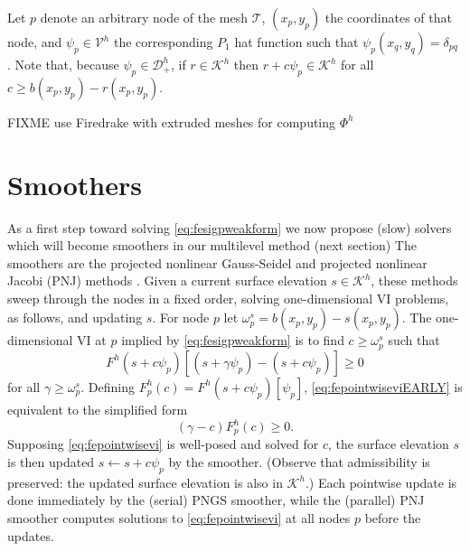 \documentclass[letterpaper,final,12pt,reqno]{amsart}
\theoremstyle{claim}
\numberwithin{equation}{section}
\numberwithin{figure}{section}
\numberwithin{table}{section}
\numberwithin{theorem}{section}
\begin{document}
Let $p$ denote an arbitrary node of the mesh $\mathcal{T}$, $(x_p,y_p)$ the coordinates of that node, and $\psi_p \in \mathcal{V}^h$ the corresponding $P_1$ hat function such that $\psi_p(x_q,y_q)=\delta_{pq}$ \cite{Elmanetal2014}.  Note that, because $\psi_p \in \mathcal{D}_+^h$, if $r \in \mathcal{K}^h$ then $r + c \psi_p \in \mathcal{K}^h$ for all $c\ge b(x_p,y_p) - r(x_p,y_p)$.

FIXME use Firedrake \cite{Alnaesetal2014,Rathgeberetal2016} with extruded meshes \cite{Gibsonetal2019,McRaeetal2016} for computing $\Phi^h$


\section{Smoothers} \label{sec:smoothers}

As a first step toward solving \eqref{eq:fesigpweakform} we now propose (slow) solvers which will become smoothers in our multilevel method (next section)  The smoothers are the projected nonlinear Gauss-Seidel and projected nonlinear Jacobi (PNJ) methods \cite{KinderlehrerStampacchia1980}.  Given a current surface elevation $s\in \mathcal{K}^h$, these methods sweep through the nodes in a fixed order, solving one-dimensional VI problems, as follows, and updating $s$.  For node $p$ let $\omega_p^s = b(x_p,y_p) - s(x_p,y_p)$.  The one-dimensional VI at $p$ implied by \eqref{eq:fesigpweakform} is to find $c \ge \omega_p^s$ such that
\begin{equation}
F^h(s+c\psi_p)[(s+\gamma \psi_p) - (s+c \psi_p)] \ge 0 \label{eq:fepointwiseviEARLY}
\end{equation}
for all $\gamma \ge \omega_p^s$.  Defining $F_p^h(c) = F^h(s+c\psi_p)[\psi_p]$, \eqref{eq:fepointwiseviEARLY} is equivalent to the simplified form
\begin{equation}
(\gamma - c) F_p^h(c) \ge 0. \label{eq:fepointwisevi}
\end{equation}
Supposing \eqref{eq:fepointwisevi} is well-posed and solved for $c$, the surface elevation $s$ is then updated $s \gets s + c \psi_p$ by the smoother.  (Observe that admissibility is preserved: the updated surface elevation is also in $\mathcal{K}^h$.)  Each pointwise update is done immediately by the (serial) PNGS smoother, while the (parallel) PNJ smoother computes solutions to \eqref{eq:fepointwisevi} at all nodes $p$ before the updates.
\end{document}
